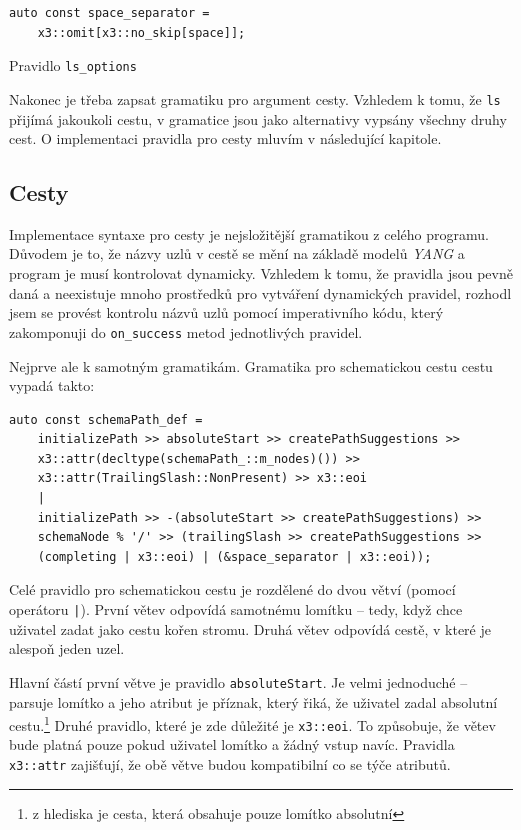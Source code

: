 \documentclass[thesis=B,czech,hidelinks]{FITthesis}[2019/03/06]
\begin{document}
\begin{listing}
\begin{verbatim}
auto const space_separator =
    x3::omit[x3::no_skip[space]];
\end{verbatim}
\caption{Pravidlo \texttt{ls\_options}}\label{grammar:ls:options}
\end{listing}

Nakonec je třeba zapsat gramatiku pro argument cesty. Vzhledem k tomu, že \texttt{ls} přijímá jakoukoli cestu, v gramatice jsou jako alternativy vypsány všechny druhy cest. O implementaci pravidla pro cesty mluvím v následující kapitole.

\subsection{Cesty}
Implementace syntaxe pro cesty je nejsložitější gramatikou z celého programu. Důvodem je to, že názvy uzlů v cestě se mění na základě modelů \textit{YANG} a program je musí kontrolovat dynamicky. Vzhledem k tomu, že pravidla jsou pevně daná a neexistuje mnoho prostředků pro vytváření dynamických pravidel, rozhodl jsem se provést kontrolu názvů uzlů pomocí imperativního kódu, který zakomponuji do \verb¨on_success¨ metod jednotlivých pravidel.

Nejprve ale k samotným gramatikám. Gramatika pro schematickou cestu cestu vypadá takto:
\begin{verbatim}
auto const schemaPath_def =
    initializePath >> absoluteStart >> createPathSuggestions >>
    x3::attr(decltype(schemaPath_::m_nodes)()) >>
    x3::attr(TrailingSlash::NonPresent) >> x3::eoi
    |
    initializePath >> -(absoluteStart >> createPathSuggestions) >>
    schemaNode % '/' >> (trailingSlash >> createPathSuggestions >>
    (completing | x3::eoi) | (&space_separator | x3::eoi));

\end{verbatim}
Celé pravidlo pro schematickou cestu je rozdělené do dvou větví (pomocí operátoru \texttt{|}). První větev odpovídá samotnému lomítku -- tedy, když chce uživatel zadat jako cestu kořen stromu. Druhá větev odpovídá cestě, v které je alespoň jeden uzel.

Hlavní částí první větve je pravidlo \texttt{absoluteStart}. Je velmi jednoduché -- parsuje lomítko a jeho atribut je příznak, který řiká, že uživatel zadal absolutní cestu.\footnote{z hlediska  je cesta, která obsahuje pouze lomítko absolutní} Druhé pravidlo, které je zde důležité je \texttt{x3::eoi}. To způsobuje, že větev bude platná pouze pokud uživatel lomítko a žádný vstup navíc. Pravidla \texttt{x3::attr} zajišťují, že obě větve budou kompatibilní co se týče atributů.
\end{document}
